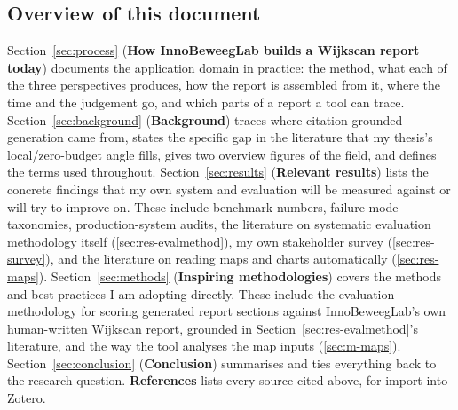 \subsection{Overview of this document}\label{sec:overview}

Section~\ref{sec:process} (\textbf{How InnoBeweegLab builds a Wijkscan report today}) documents the application domain in practice: the method, what each of the three perspectives produces, how the report is assembled from it, where the time and the judgement go, and which parts of a report a tool can trace. Section~\ref{sec:background} (\textbf{Background}) traces where citation-grounded generation came from, states the specific gap in the literature that my thesis's local/zero-budget angle fills, gives two overview figures of the field, and defines the terms used throughout. Section~\ref{sec:results} (\textbf{Relevant results}) lists the concrete findings that my own system and evaluation will be measured against or will try to improve on. These include benchmark numbers, failure-mode taxonomies, production-system audits, the literature on systematic evaluation methodology itself (\ref{sec:res-evalmethod}), my own stakeholder survey (\ref{sec:res-survey}), and the literature on reading maps and charts automatically (\ref{sec:res-maps}). Section~\ref{sec:methods} (\textbf{Inspiring methodologies}) covers the methods and best practices I am adopting directly. These include the evaluation methodology for scoring generated report sections against InnoBeweegLab's own human-written Wijkscan report, grounded in Section~\ref{sec:res-evalmethod}'s literature, and the way the tool analyses the map inputs (\ref{sec:m-maps}). Section~\ref{sec:conclusion} (\textbf{Conclusion}) summarises and ties everything back to the research question. \textbf{References} lists every source cited above, for import into Zotero.


